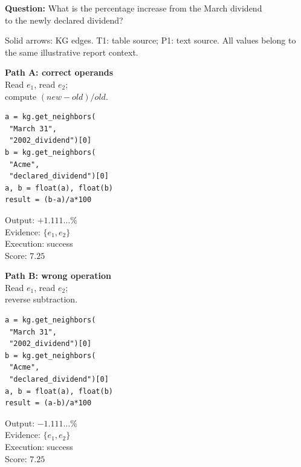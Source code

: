 \begin{center}
\textbf{Question:} What is the percentage increase from the March dividend\\
to the newly declared dividend?\par\smallskip
{}\par
{\scriptsize Solid arrows: KG edges. T1: table source; P1: text source.
All values belong to the same illustrative report context.}\par\medskip
\end{center}
\noindent
\begin{minipage}[t]{0.315\linewidth}
\centering\small\textbf{Path A: correct operands}\\
\scriptsize Read $e_1$, read $e_2$;\\compute $(new-old)/old$.\par
\begin{lstlisting}[basicstyle=\ttfamily\scriptsize]
a = kg.get_neighbors(
 "March 31",
 "2002_dividend")[0]
b = kg.get_neighbors(
 "Acme",
 "declared_dividend")[0]
a, b = float(a), float(b)
result = (b-a)/a*100
\end{lstlisting}
\scriptsize Output: $+1.111\ldots\%$\\
Evidence: $\{e_1,e_2\}$\\
Execution: success\\
Score: $7.25$
\end{minipage}\hfill
\begin{minipage}[t]{0.315\linewidth}
\centering\small\textbf{Path B: wrong operation}\\
\scriptsize Read $e_1$, read $e_2$;\\reverse subtraction.\par
\begin{lstlisting}[basicstyle=\ttfamily\scriptsize]
a = kg.get_neighbors(
 "March 31",
 "2002_dividend")[0]
b = kg.get_neighbors(
 "Acme",
 "declared_dividend")[0]
a, b = float(a), float(b)
result = (a-b)/a*100
\end{lstlisting}
\scriptsize Output: $-1.111\ldots\%$\\
Evidence: $\{e_1,e_2\}$\\
Execution: success\\
Score: $7.25$
\end{minipage}\hfill
